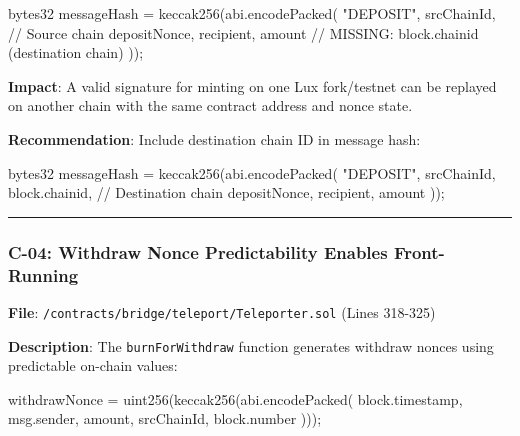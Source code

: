 \documentclass[
]{article}
\newenvironment{Shaded}{}{}
\newcommand{\NormalTok}[1]{#1}
\begin{document}
\begin{Shaded}
\begin{Highlighting}[]
\NormalTok{bytes32 messageHash = keccak256(abi.encodePacked(}
\NormalTok{    "DEPOSIT",}
\NormalTok{    srcChainId,        // Source chain}
\NormalTok{    depositNonce,}
\NormalTok{    recipient,}
\NormalTok{    amount}
\NormalTok{    // MISSING: block.chainid (destination chain)}
\NormalTok{));}
\end{Highlighting}
\end{Shaded}

\textbf{Impact}: A valid signature for minting on one Lux fork/testnet
can be replayed on another chain with the same contract address and
nonce state.

\textbf{Recommendation}: Include destination chain ID in message hash:

\begin{Shaded}
\begin{Highlighting}[]
\NormalTok{bytes32 messageHash = keccak256(abi.encodePacked(}
\NormalTok{    "DEPOSIT",}
\NormalTok{    srcChainId,}
\NormalTok{    block.chainid,     // Destination chain}
\NormalTok{    depositNonce,}
\NormalTok{    recipient,}
\NormalTok{    amount}
\NormalTok{));}
\end{Highlighting}
\end{Shaded}

\begin{center}\rule{0.5\linewidth}{0.5pt}\end{center}

\subsubsection{C-04: Withdraw Nonce Predictability Enables
Front-Running}\label{c-04-withdraw-nonce-predictability-enables-front-running}

\textbf{File}: \texttt{/contracts/bridge/teleport/Teleporter.sol} (Lines
318-325)

\textbf{Description}: The \texttt{burnForWithdraw} function generates
withdraw nonces using predictable on-chain values:

\begin{Shaded}
\begin{Highlighting}[]
\NormalTok{withdrawNonce = uint256(keccak256(abi.encodePacked(}
\NormalTok{    block.timestamp,}
\NormalTok{    msg.sender,}
\NormalTok{    amount,}
\NormalTok{    srcChainId,}
\NormalTok{    block.number}
\NormalTok{)));}
\end{Highlighting}
\end{Shaded}
\end{document}
